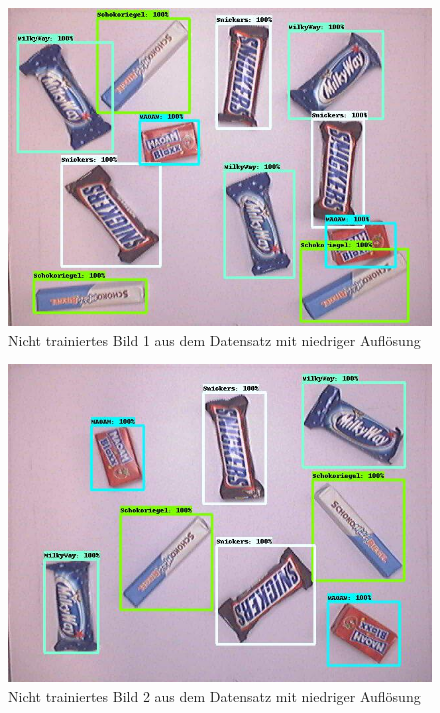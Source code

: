     \begin{figure}[H]
        \centering
        \includegraphics[angle = 90, width = \textwidth]{Bilder/models/model_comparison/faster_rcnn_resnet50_v1_640x640_coco17_tpu-8/non_trained_1.jpg}
        \caption{Nicht trainiertes Bild 1 aus dem Datensatz mit niedriger Auflösung}
    \end{figure}
    
    \begin{figure}[H]
        \centering
        \includegraphics[angle = 90, width = \textwidth]{Bilder/models/model_comparison/faster_rcnn_resnet50_v1_640x640_coco17_tpu-8/non_trained_2.jpg}
        \caption{Nicht trainiertes Bild 2 aus dem Datensatz mit niedriger Auflösung}
    \end{figure}
    
